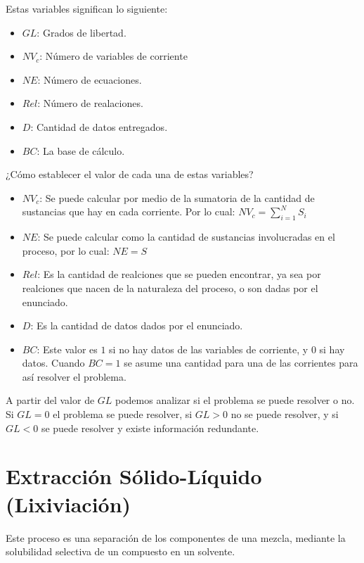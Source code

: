 
Estas variables significan lo siguiente:
\begin{itemize}
    \item $GL$: Grados de libertad.
    \item $NV_c$: Número de variables de corriente
    \item $NE$: Número de ecuaciones.
    \item $Rel$: Número de realaciones.
    \item $D$: Cantidad de datos entregados.
    \item $BC$: La base de cálculo.
\end{itemize}

¿Cómo establecer el valor de cada una de estas variables?

\begin{itemize}
    \item $NV_c$: Se puede calcular por medio de la sumatoria de la cantidad de sustancias que hay en cada corriente. Por lo cual: $NV_c=\sum_{i=1}^{N}S_i$
    \item $NE$: Se puede calcular como la cantidad de sustancias involucradas en el proceso, por lo cual: $NE=S$
    \item $Rel$: Es la cantidad de realciones que se pueden encontrar, ya sea por realciones que nacen de la naturaleza del proceso, o son dadas por el enunciado.
    \item $D$: Es la cantidad de datos dados por el enunciado.
    \item $BC$: Este valor es $1$ si no hay datos de las variables de corriente, y $0$ si hay datos. Cuando $BC=1$ se asume una cantidad para una de las corrientes para así resolver el problema.
\end{itemize}

A partir del valor de $GL$ podemos analizar si el problema se puede resolver o no. Si $GL=0$ el problema se puede resolver, si $GL>0$ no se puede resolver, y si $GL<0$ se puede resolver y existe información redundante.

\clearpage
\section{Extracción Sólido-Líquido (Lixiviación)}

Este proceso es una separación de los componentes de una mezcla, mediante la solubilidad selectiva de un compuesto en un solvente.

